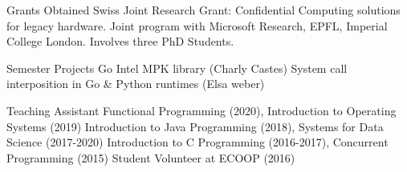 


\begin{cvskills}

\cvskill
{Grants Obtained}
{Swiss Joint Research Grant: Confidential Computing solutions for legacy hardware.\linebreak
  Joint program with Microsoft Research, EPFL, Imperial College London.\linebreak
  Involves three PhD Students.\linebreak
}

\cvskill
{Semester Projects}
{
  Go Intel MPK library (Charly Castes)\linebreak
  System call interposition in Go \& Python runtimes (Elsa weber)\linebreak
}

\cvskill
{Teaching Assistant} %
{
  Functional Programming (2020), Introduction to Operating Systems (2019)\linebreak
  Introduction to Java Programming (2018), Systems for Data Science (2017-2020)\linebreak
  Introduction to C Programming (2016-2017), Concurrent Programming (2015)\linebreak
	Student Volunteer at ECOOP (2016)
}

\end{cvskills}
